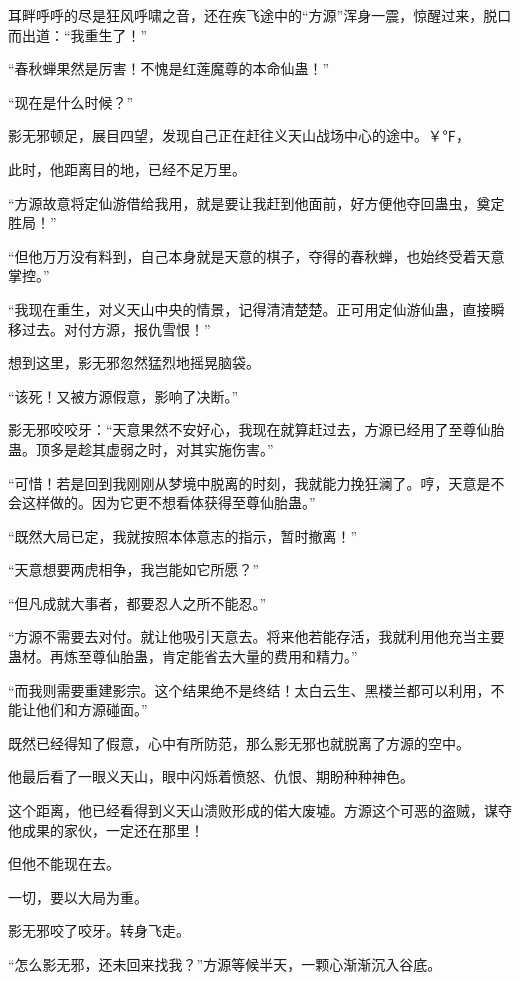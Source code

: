
\begin{this_body}

耳畔呼呼的尽是狂风呼啸之音，还在疾飞途中的“方源”浑身一震，惊醒过来，脱口而出道：“我重生了！”

“春秋蝉果然是厉害！不愧是红莲魔尊的本命仙蛊！”

“现在是什么时候？”

影无邪顿足，展目四望，发现自己正在赶往义天山战场中心的途中。￥℉，

此时，他距离目的地，已经不足万里。

“方源故意将定仙游借给我用，就是要让我赶到他面前，好方便他夺回蛊虫，奠定胜局！”

“但他万万没有料到，自己本身就是天意的棋子，夺得的春秋蝉，也始终受着天意掌控。”

“我现在重生，对义天山中央的情景，记得清清楚楚。正可用定仙游仙蛊，直接瞬移过去。对付方源，报仇雪恨！”

想到这里，影无邪忽然猛烈地摇晃脑袋。

“该死！又被方源假意，影响了决断。”

影无邪咬咬牙：“天意果然不安好心，我现在就算赶过去，方源已经用了至尊仙胎蛊。顶多是趁其虚弱之时，对其实施伤害。”

“可惜！若是回到我刚刚从梦境中脱离的时刻，我就能力挽狂澜了。哼，天意是不会这样做的。因为它更不想看体获得至尊仙胎蛊。”

“既然大局已定，我就按照本体意志的指示，暂时撤离！”

“天意想要两虎相争，我岂能如它所愿？”

“但凡成就大事者，都要忍人之所不能忍。”

“方源不需要去对付。就让他吸引天意去。将来他若能存活，我就利用他充当主要蛊材。再炼至尊仙胎蛊，肯定能省去大量的费用和精力。”

“而我则需要重建影宗。这个结果绝不是终结！太白云生、黑楼兰都可以利用，不能让他们和方源碰面。”

既然已经得知了假意，心中有所防范，那么影无邪也就脱离了方源的空中。

他最后看了一眼义天山，眼中闪烁着愤怒、仇恨、期盼种种神色。

这个距离，他已经看得到义天山溃败形成的偌大废墟。方源这个可恶的盗贼，谋夺他成果的家伙，一定还在那里！

但他不能现在去。

一切，要以大局为重。

影无邪咬了咬牙。转身飞走。

“怎么影无邪，还未回来找我？”方源等候半天，一颗心渐渐沉入谷底。


\end{this_body}
